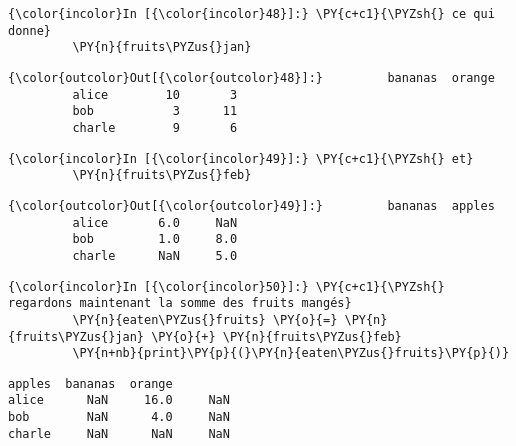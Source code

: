     \begin{Verbatim}[commandchars=\\\{\},frame=single,framerule=0.3mm,rulecolor=\color{cellframecolor}]
{\color{incolor}In [{\color{incolor}48}]:} \PY{c+c1}{\PYZsh{} ce qui donne}
         \PY{n}{fruits\PYZus{}jan}
\end{Verbatim}


\begin{Verbatim}[commandchars=\\\{\},frame=single,framerule=0.3mm,rulecolor=\color{cellframecolor}]
{\color{outcolor}Out[{\color{outcolor}48}]:}         bananas  orange
         alice        10       3
         bob           3      11
         charle        9       6
\end{Verbatim}
            
    \begin{Verbatim}[commandchars=\\\{\},frame=single,framerule=0.3mm,rulecolor=\color{cellframecolor}]
{\color{incolor}In [{\color{incolor}49}]:} \PY{c+c1}{\PYZsh{} et}
         \PY{n}{fruits\PYZus{}feb}
\end{Verbatim}


\begin{Verbatim}[commandchars=\\\{\},frame=single,framerule=0.3mm,rulecolor=\color{cellframecolor}]
{\color{outcolor}Out[{\color{outcolor}49}]:}         bananas  apples
         alice       6.0     NaN
         bob         1.0     8.0
         charle      NaN     5.0
\end{Verbatim}
            
    \begin{Verbatim}[commandchars=\\\{\},frame=single,framerule=0.3mm,rulecolor=\color{cellframecolor}]
{\color{incolor}In [{\color{incolor}50}]:} \PY{c+c1}{\PYZsh{} regardons maintenant la somme des fruits mangés}
         \PY{n}{eaten\PYZus{}fruits} \PY{o}{=} \PY{n}{fruits\PYZus{}jan} \PY{o}{+} \PY{n}{fruits\PYZus{}feb}
         \PY{n+nb}{print}\PY{p}{(}\PY{n}{eaten\PYZus{}fruits}\PY{p}{)}
\end{Verbatim}


    \begin{Verbatim}[commandchars=\\\{\},frame=single,framerule=0.3mm,rulecolor=\color{cellframecolor}]
        apples  bananas  orange
alice      NaN     16.0     NaN
bob        NaN      4.0     NaN
charle     NaN      NaN     NaN
\end{Verbatim}

